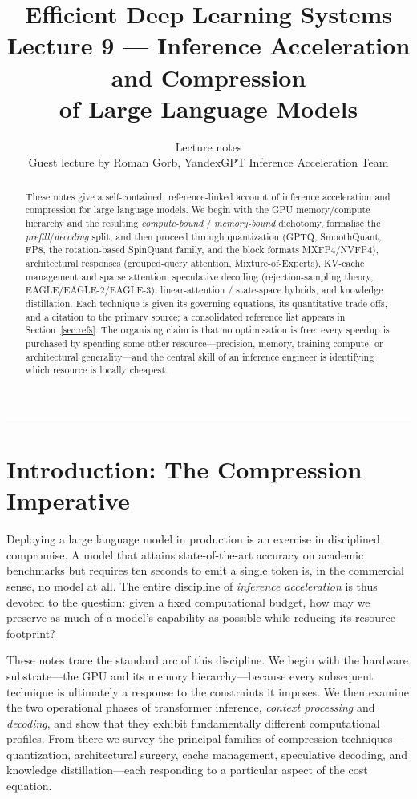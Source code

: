 \documentclass[11pt,a4paper]{article}
\title{\textbf{Efficient Deep Learning Systems} \\[0.3em]
       \large Lecture 9 --- Inference Acceleration and Compression \\
       of Large Language Models}
\author{Lecture notes \\[0.2em]
        \small Guest lecture by Roman Gorb, YandexGPT Inference Acceleration Team}
\date{}
\theoremstyle{definition}
\theoremstyle{remark}
\theoremstyle{plain}
\begin{document}
\sloppy
\maketitle

\begin{abstract}
\noindent
These notes give a self-contained, reference-linked account of inference
acceleration and compression for large language models. We begin with the
GPU memory/compute hierarchy and the resulting \emph{compute-bound} /
\emph{memory-bound} dichotomy, formalise the \emph{prefill}/\emph{decoding}
split, and then proceed through quantization (GPTQ, SmoothQuant, FP8, the
rotation-based SpinQuant family, and the block formats MXFP4/NVFP4),
architectural responses (grouped-query attention, Mixture-of-Experts),
KV-cache management and sparse attention, speculative decoding
(rejection-sampling theory, EAGLE/EAGLE-2/EAGLE-3), linear-attention /
state-space hybrids, and knowledge distillation. Each technique is given
its governing equations, its quantitative trade-offs, and a citation to
the primary source; a consolidated reference list appears in
Section~\ref{sec:refs}. The organising claim is that no optimisation is
free: every speedup is purchased by spending some other resource---precision,
memory, training compute, or architectural generality---and the central
skill of an inference engineer is identifying which resource is locally
cheapest.
\end{abstract}

\tableofcontents
\bigskip
\hrule
\bigskip

\section{Introduction: The Compression Imperative}

Deploying a large language model in production is an exercise in
disciplined compromise. A model that attains state-of-the-art accuracy on
academic benchmarks but requires ten seconds to emit a single token is, in
the commercial sense, no model at all. The entire discipline of
\emph{inference acceleration} is thus devoted to the question: given a
fixed computational budget, how may we preserve as much of a model's
capability as possible while reducing its resource footprint?

These notes trace the standard arc of this discipline. We begin with the
hardware substrate---the GPU and its memory hierarchy---because every
subsequent technique is ultimately a response to the constraints it
imposes. We then examine the two operational phases of transformer
inference, \emph{context processing} and \emph{decoding}, and show that
they exhibit fundamentally different computational profiles. From there
we survey the principal families of compression techniques---quantization,
architectural surgery, cache management, speculative decoding, and
knowledge distillation---each responding to a particular aspect of the
cost equation.
\end{document}

